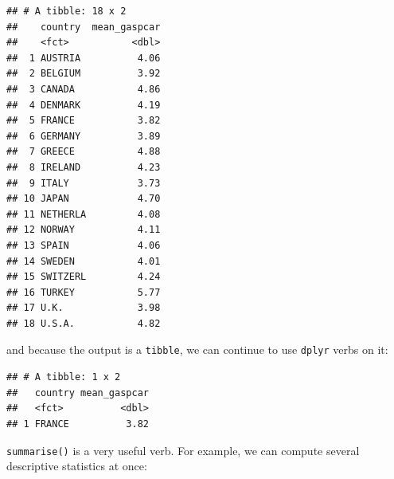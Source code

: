 \documentclass[]{gitbook}
\newenvironment{Shaded}{\begin{snugshade}}{\end{snugshade}}
\newcommand{\DataTypeTok}[1]{\textcolor[rgb]{0.13,0.29,0.53}{#1}}
\newcommand{\KeywordTok}[1]{\textcolor[rgb]{0.13,0.29,0.53}{\textbf{#1}}}
\newcommand{\NormalTok}[1]{#1}
\newcommand{\OperatorTok}[1]{\textcolor[rgb]{0.81,0.36,0.00}{\textbf{#1}}}
\newcommand{\StringTok}[1]{\textcolor[rgb]{0.31,0.60,0.02}{#1}}
\theoremstyle{definition}
\theoremstyle{definition}
\theoremstyle{definition}
\theoremstyle{remark}
\begin{document}
\begin{verbatim}
## # A tibble: 18 x 2
##    country  mean_gaspcar
##    <fct>           <dbl>
##  1 AUSTRIA          4.06
##  2 BELGIUM          3.92
##  3 CANADA           4.86
##  4 DENMARK          4.19
##  5 FRANCE           3.82
##  6 GERMANY          3.89
##  7 GREECE           4.88
##  8 IRELAND          4.23
##  9 ITALY            3.73
## 10 JAPAN            4.70
## 11 NETHERLA         4.08
## 12 NORWAY           4.11
## 13 SPAIN            4.06
## 14 SWEDEN           4.01
## 15 SWITZERL         4.24
## 16 TURKEY           5.77
## 17 U.K.             3.98
## 18 U.S.A.           4.82
\end{verbatim}

and because the output is a \texttt{tibble}, we can continue to use
\texttt{dplyr} verbs on it:

\begin{Shaded}
\end{Shaded}

\begin{verbatim}
## # A tibble: 1 x 2
##   country mean_gaspcar
##   <fct>          <dbl>
## 1 FRANCE          3.82
\end{verbatim}

\texttt{summarise()} is a very useful verb. For example, we can compute
several descriptive statistics at once:

\begin{Shaded}
\end{Shaded}
\end{document}
